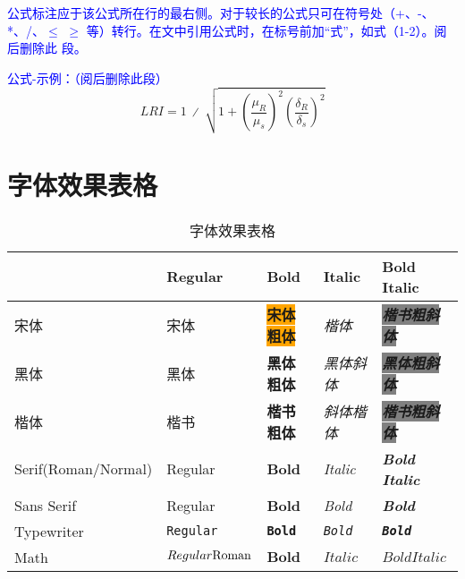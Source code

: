 \textcolor{blue}{公式标注应于该公式所在行的最右侧。对于较长的公式只可在符号处（+、-、*、/、$\leqslant$ $\geqslant$ 等）转行。在文中引用公式时，在标号前加“式”，如式（1-2）。阅后删除此
段。}

\textcolor{blue}{公式-示例：（阅后删除此段）}
\begin{equation}
    LRI=1\ ∕\ \sqrt{1+{\left(\frac{{\mu }_{R}}{{\mu }_{s}}\right)}^{2}{\left(\frac{{\delta }_{R}}{{\delta }_{s}}\right)}^{2}}
\end{equation}


\section{字体效果表格}


\begin{table}[htb]
    \centering
    \caption{字体效果表格}
    \begin{tabular}{@{}lllll@{}}
    \toprule
               & Regular & Bold & Italic & Bold Italic \\ \midrule
      宋体       & 宋体      & \colorbox{orange}{\textbf{宋体粗体}} & \textit{楷体}     &   \colorbox{gray}{\textbf{\textit{楷书粗斜体}}}  \\
      黑体         & {\heiti{}黑体}      & \textbf{\heiti{}黑体粗体} &   \textit{\heiti{}黑体斜体}     & \colorbox{gray}{\textit{\textbf{\heiti{}黑体粗斜体}}}   \\
      楷体         & {\kaishu{}楷书}      & \textbf{\kaishu{}楷书粗体} & \textit{\kaishu{}斜体楷体} &  \colorbox{gray}{\textbf{\textit{\kaishu{}楷书粗斜体}}}    \\
    Serif(Roman/Normal)      &    Regular    &  \textbf{Bold}  &    \textit{Italic}    &     \textbf{\textit{Bold Italic}}    \\
    Sans Serif &  \textsf{Regular}       &  \textbf{\textsf{Bold}}    &  \textit{\textsf{Bold}}   &    \textbf{\textit{\textsf{Bold}}}   \\
    Typewriter &  \texttt{Regular}       &  \textbf{\texttt{Bold}}    &  \textit{\texttt{Bold}}   &    \textbf{\textit{\texttt{Bold}}}   \\
    Math       &   $\mathnormal{Regular} \mathrm{Roman}$  & $\mathbf{Bold}$   &    $\mathit{Italic}$    &  $\mathbf{\mathit{Bold Italic}}$    \\ \bottomrule
    \end{tabular}
\end{table}

